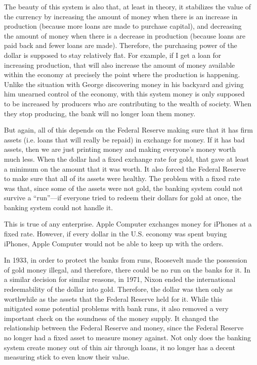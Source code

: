 The beauty of this system is also that, at least in theory, it stabilizes
the value of the currency by increasing the amount of money when there
is an increase in production (because more loans are made to purchase capital), and decreasing the amount of money when
there is a decrease in production (because loans are paid back and fewer loans are made). Therefore, the purchasing power of
the dollar is supposed to stay relatively flat.
For example, if I get
a loan for increasing production, that will also increase the amount of
money available within the economy at precisely the point where the
production is happening.  Unlike the situation with George discovering
money in his backyard and giving him unearned control of the economy, 
with this system money is only supposed to be increased by
producers who are contributing to the wealth of society.  When they 
stop producing, the bank will no longer loan them money.

But again, all of this depends on the Federal Reserve making sure that
it has firm assets (i.e. loans that will really be repaid) in exchange for money. 
If it has bad assets, then we
are just printing money and making everyone’s money worth much less.
When the dollar had a fixed exchange rate for gold, that gave at least
a minimum on the amount that it was worth. It also forced the Federal
Reserve to make sure that all of its assets were healthy. The problem
with a fixed rate was that, since some of the assets
were not gold, the banking system could not survive a ``run''---if everyone tried to redeem their dollars
for gold at once, the banking system
could not handle it.

This is true of any enterprise. Apple Computer exchanges money for
iPhones at a fixed rate. However, if every dollar in the U.S. economy
was spent buying iPhones, Apple Computer would not be able to keep up
with the orders.

In 1933, in order to protect the banks from runs, Roosevelt made the
possession of gold money illegal, and therefore, there could be no run
on the banks for it. In a similar decision for similar reasons, in
1971, Nixon ended the international redeemability of the dollar into
gold. Therefore, the dollar was then only as worthwhile as the assets
that the Federal Reserve held for it.  While this mitigated some potential
problems with bank runs, it also removed a very important check on 
the soundness of the money supply.  It changed the relationship between
the Federal Reserve and money, since the Federal Reserve no longer had a
fixed asset to measure money against.  Not only does the banking
system create money out of thin air through loans, it no longer
has a decent measuring stick to even know their value.

